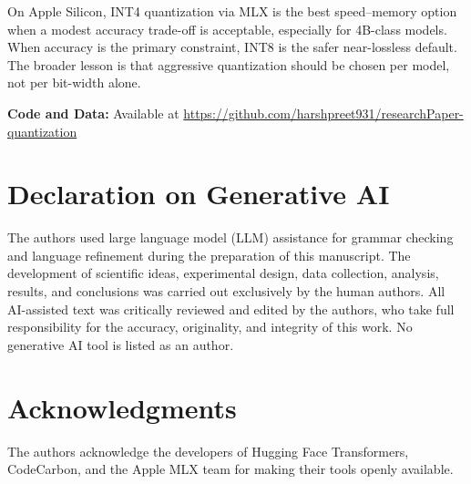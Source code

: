 \documentclass[journal]{IEEEtran}
\begin{document}
On Apple Silicon, INT4 quantization via MLX is the best speed--memory option when a modest accuracy trade-off is acceptable, especially for 4B-class models. When accuracy is the primary constraint, INT8 is the safer near-lossless default. The broader lesson is that aggressive quantization should be chosen per model, not per bit-width alone.

\begin{sloppypar}
\noindent\textbf{Code and Data:} Available at \url{https://github.com/harshpreet931/researchPaper-quantization}
\end{sloppypar}

\section*{Declaration on Generative AI}

The authors used large language model (LLM) assistance for grammar checking and language refinement during the preparation of this manuscript. The development of scientific ideas, experimental design, data collection, analysis, results, and conclusions was carried out exclusively by the human authors. All AI-assisted text was critically reviewed and edited by the authors, who take full responsibility for the accuracy, originality, and integrity of this work. No generative AI tool is listed as an author.

\section*{Acknowledgments}

The authors acknowledge the developers of Hugging Face Transformers, CodeCarbon, and the Apple MLX team for making their tools openly available.


\end{document}
